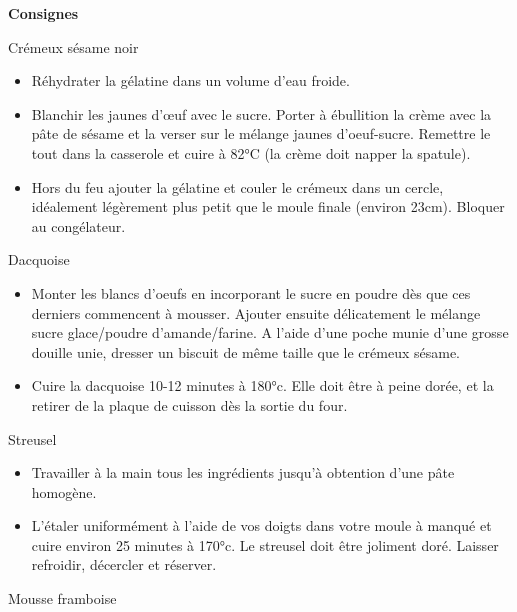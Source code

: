 \documentclass[]{book}
\providecommand{\tightlist}{%
  \setlength{\itemsep}{0pt}\setlength{\parskip}{0pt}}
\begin{document}
\textbf{Consignes}

Crémeux sésame noir

\begin{itemize}
\tightlist
\item
  Réhydrater la gélatine dans un volume d'eau froide.
\item
  Blanchir les jaunes d'œuf avec le sucre. Porter à ébullition la crème
  avec la pâte de sésame et la verser sur le mélange jaunes
  d'oeuf-sucre. Remettre le tout dans la casserole et cuire à 82°C (la
  crème doit napper la spatule).
\item
  Hors du feu ajouter la gélatine et couler le crémeux dans un cercle,
  idéalement légèrement plus petit que le moule finale (environ 23cm).
  Bloquer au congélateur.
\end{itemize}

Dacquoise

\begin{itemize}
\tightlist
\item
  Monter les blancs d'oeufs en incorporant le sucre en poudre dès que
  ces derniers commencent à mousser. Ajouter ensuite délicatement le
  mélange sucre glace/poudre d'amande/farine. A l'aide d'une poche munie
  d'une grosse douille unie, dresser un biscuit de même taille que le
  crémeux sésame.
\item
  Cuire la dacquoise 10-12 minutes à 180°c. Elle doit être à peine
  dorée, et la retirer de la plaque de cuisson dès la sortie du four.
\end{itemize}

Streusel

\begin{itemize}
\tightlist
\item
  Travailler à la main tous les ingrédients jusqu'à obtention d'une pâte
  homogène.
\item
  L'étaler uniformément à l'aide de vos doigts dans votre moule à manqué
  et cuire environ 25 minutes à 170°c. Le streusel doit être joliment
  doré. Laisser refroidir, décercler et réserver.
\end{itemize}

Mousse framboise
\end{document}
